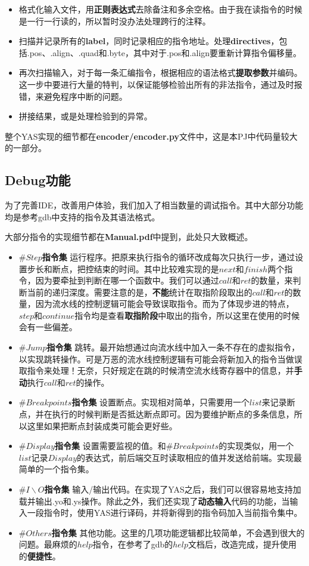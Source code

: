 \documentclass[a4paper,11pt,UTF8]{ctexart}
\begin{document}
\begin{sloppypar}
\begin{itemize}
\item 格式化输入文件，用{\bf 正则表达式}去除备注和多余空格。由于我在读指令的时候是一行一行读的，所以暂时没办法处理跨行的注释。
\item 扫描并记录所有的{\bf label}，同时记录相应的指令地址。处理{\bf directives}，包括.pos、.align、.quad和.byte，其中对于.pos和.align要重新计算指令偏移量。
\item 再次扫描输入，对于每一条汇编指令，根据相应的语法格式{\bf 提取参数}并编码。这一步中要进行大量的特判，以保证能够检验出所有的非法指令，通过及时报错，来避免程序中断的问题。
\item 拼接结果，或是处理检验到的异常。
\end{itemize}

整个YAS实现的细节都在{\bf encoder/encoder.py}文件中，这是本PJ中代码量较大的一部分。

\subsection{{\bf Debug功能}}

为了完善IDE，改善用户体验，我们加入了相当数量的调试指令。其中大部分功能均是参考gdb中支持的指令及其语法格式。

大部分指令的实现细节都在{\bf Manual.pdf}中提到，此处只大致概述。
\begin{itemize}
\item {\bf $\#Step$指令集} \quad 运行程序。把原来执行指令的循环改成每次只执行一步，通过设置步长和断点，把控结束的时间。其中比较难实现的是$next$和$finish$两个指令，因为要牵扯到判断在哪一个函数中。我们可以通过$call$和$ret$的数量，来判断当前的递归深度。需要注意的是，{\bf 不能}统计在取指阶段取出的$call$和$ret$的数量，因为流水线的控制逻辑可能会导致误取指令。而为了体现步进的特点，$step$和$continue$指令均是查看{\bf 取指阶段}中取出的指令，所以这里在使用的时候会有一些偏差。
\item {\bf $\#Jump$指令集} \quad 跳转。最开始想通过向流水线中加入一条不存在的虚拟指令，以实现跳转操作。可是万恶的流水线控制逻辑有可能会将新加入的指令当做误取指令来处理！无奈，只好规定在跳的时候清空流水线寄存器中的信息，并{\bf 手动}执行$call$和$ret$的操作。
\item {\bf $\#Breakpoints$指令集} \quad 设置断点。实现相对简单，只需要用一个$list$来记录断点，并在执行的时候判断是否抵达断点即可。因为要维护断点的多条信息，所以这里如果把断点封装成类可能会更好些。
\item {\bf $\#Display$指令集} \quad 设置需要监视的值。和$\#Breakpoints$的实现类似，用一个$list$记录$Display$的表达式，前后端交互时读取相应的值并发送给前端。实现最简单的一个指令集。
\item {\bf $\#I\backslash O$指令集} \quad 输入/输出代码。在实现了YAS之后，我们可以很容易地支持加载并输出.yo和.ys操作。除此之外，我们还实现了{\bf 动态输入}代码的功能，当输入一段指令时，使用YAS进行译码，并将新得到的指令码加入当前指令集中。
\item {\bf $\#Others$指令集} \quad 其他功能。这里的几项功能逻辑都比较简单，不会遇到很大的问题。最麻烦的$help$指令，在参考了gdb的$help$文档后，改造完成，提升使用的{\bf 便捷性}。
\end{itemize}


\end{sloppypar}
\end{document}
